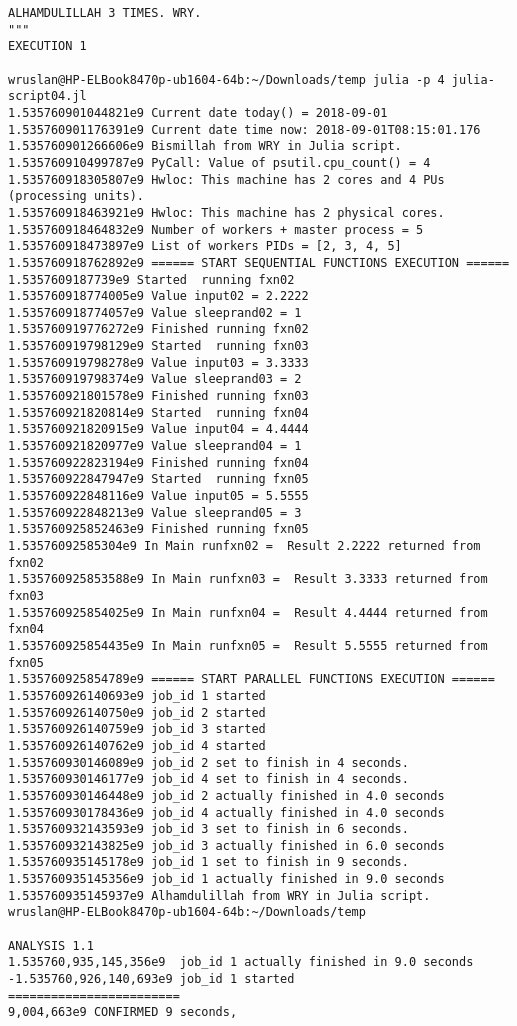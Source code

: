 \begin{lstlisting}[caption={App4-Julia Parallel Programming Codes}, label=App4-Julia Parallel Programming Codes]
ALHAMDULILLAH 3 TIMES. WRY.
"""
EXECUTION 1

wruslan@HP-ELBook8470p-ub1604-64b:~/Downloads/temp julia -p 4 julia-script04.jl
1.535760901044821e9 Current date today() = 2018-09-01
1.535760901176391e9 Current date time now: 2018-09-01T08:15:01.176
1.535760901266606e9 Bismillah from WRY in Julia script. 
1.535760910499787e9 PyCall: Value of psutil.cpu_count() = 4 
1.535760918305807e9 Hwloc: This machine has 2 cores and 4 PUs (processing units). 
1.535760918463921e9 Hwloc: This machine has 2 physical cores. 
1.535760918464832e9 Number of workers + master process = 5 
1.535760918473897e9 List of workers PIDs = [2, 3, 4, 5] 
1.535760918762892e9 ====== START SEQUENTIAL FUNCTIONS EXECUTION ====== 
1.5357609187739e9 Started  running fxn02 
1.535760918774005e9 Value input02 = 2.2222 
1.535760918774057e9 Value sleeprand02 = 1 
1.535760919776272e9 Finished running fxn02 
1.535760919798129e9 Started  running fxn03 
1.535760919798278e9 Value input03 = 3.3333 
1.535760919798374e9 Value sleeprand03 = 2 
1.535760921801578e9 Finished running fxn03 
1.535760921820814e9 Started  running fxn04 
1.535760921820915e9 Value input04 = 4.4444 
1.535760921820977e9 Value sleeprand04 = 1 
1.535760922823194e9 Finished running fxn04 
1.535760922847947e9 Started  running fxn05 
1.535760922848116e9 Value input05 = 5.5555 
1.535760922848213e9 Value sleeprand05 = 3 
1.535760925852463e9 Finished running fxn05 
1.53576092585304e9 In Main runfxn02 =  Result 2.2222 returned from fxn02 
1.535760925853588e9 In Main runfxn03 =  Result 3.3333 returned from fxn03 
1.535760925854025e9 In Main runfxn04 =  Result 4.4444 returned from fxn04 
1.535760925854435e9 In Main runfxn05 =  Result 5.5555 returned from fxn05 
1.535760925854789e9 ====== START PARALLEL FUNCTIONS EXECUTION ====== 
1.535760926140693e9 job_id 1 started 
1.535760926140750e9 job_id 2 started 
1.535760926140759e9 job_id 3 started 
1.535760926140762e9 job_id 4 started 
1.535760930146089e9 job_id 2 set to finish in 4 seconds. 
1.535760930146177e9 job_id 4 set to finish in 4 seconds. 
1.535760930146448e9 job_id 2 actually finished in 4.0 seconds 
1.535760930178436e9 job_id 4 actually finished in 4.0 seconds 
1.535760932143593e9 job_id 3 set to finish in 6 seconds. 
1.535760932143825e9 job_id 3 actually finished in 6.0 seconds 
1.535760935145178e9 job_id 1 set to finish in 9 seconds. 
1.535760935145356e9 job_id 1 actually finished in 9.0 seconds 
1.535760935145937e9 Alhamdulillah from WRY in Julia script. 
wruslan@HP-ELBook8470p-ub1604-64b:~/Downloads/temp

ANALYSIS 1.1
1.535760,935,145,356e9  job_id 1 actually finished in 9.0 seconds 
-1.535760,926,140,693e9 job_id 1 started 
========================
9,004,663e9 CONFIRMED 9 seconds, 


\end{lstlisting}

